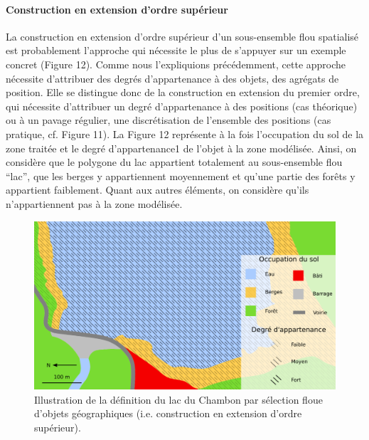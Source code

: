 \paragraph{Construction en extension d'ordre supérieur}

La construction en extension d’ordre supérieur d’un sous-ensemble flou
spatialisé est probablement l’approche qui nécessite le plus de
s’appuyer sur un exemple concret (Figure 12). Comme nous l’expliquions
précédemment, cette approche nécessite d’attribuer des degrés
d’appartenance à des objets, des agrégats de position. Elle se
distingue donc de la construction en extension du premier ordre, qui
nécessite d’attribuer un degré d’appartenance à des positions (cas
théorique) ou à un pavage régulier, une discrétisation de l’ensemble
des positions (cas pratique, cf. Figure 11). La Figure 12 représente à
la fois l’occupation du sol de la zone traitée et le degré
d’appartenance1 de l’objet à la zone modélisée. Ainsi, on considère
que le polygone du lac appartient totalement au sous-ensemble flou
“lac”, que les berges y appartiennent moyennement et qu’une partie des
forêts y appartient faiblement. Quant aux autres éléments, on
considère qu’ils n’appartiennent pas à la zone modélisée.

\begin{figure}
  \centering
  \includegraphics{../figures/fig12.png}
  \caption{Illustration de la définition du lac du Chambon par
    sélection floue d’objets géographiques (i.e. construction en
    extension d’ordre supérieur).}
  \label{fig:champ_raster_sel}
\end{figure}

